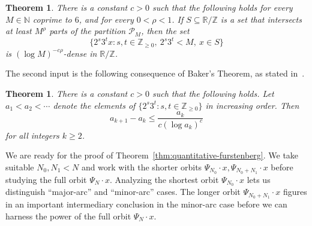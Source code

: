 \documentclass[11pt]{amsart}
\newtheorem{theorem}[lemma]{Theorem}
\theoremstyle{definition}
\begin{document}
\begin{theorem}\label{thm:BLMV-entropy}
There is a constant $c>0$ such that the following holds for every $M \in \mathbb{N}$ coprime to $6$, and for every $0<\rho<1$.  If $S \subseteq \mathbb{R}/\mathbb{Z}$ is a set that intersects at least $M^\rho$ parts of the partition $\mathcal{P}_M$, then the set
$$\{2^s 3^t x: s,t \in \mathbb{Z}_{\geq 0},~ 2^s 3^t< M,~ x \in S\}$$
is $(\log M)^{-c\rho}$-dense in $\mathbb{R}/\mathbb{Z}$.
\end{theorem}
The second input is the following consequence of Baker's Theorem, as stated in~\cite[Corollary 4.4]{BLMV08}.

\begin{theorem}\label{thm:BLMV-baker}
There is a constant $c>0$ such that the following holds.  Let $a_1<a_2<\cdots$ denote the elements of $\{2^s 3^t: s,t \in \mathbb{Z}_{\geq 0}\}$ in increasing order.  Then
$$a_{k+1}-a_k \leq \frac{a_k}{c (\log a_k)^c}$$
for all integers $k \geq 2$.
\end{theorem}
We are ready for the proof of Theorem~\ref{thm:quantitative-furstenberg}.  We take suitable $N_0,N_1<N$ and work with the shorter orbits $\Psi_{N_0} \cdot x, \Psi_{N_0+N_1} \cdot x$ before studying the full orbit $\Psi_N \cdot x$.  Analyzing the shortest orbit $\Psi_{N_0} \cdot x$ lets us distinguish ``major-arc'' and ``minor-arc'' cases.  The longer orbit $\Psi_{N_0+N_1} \cdot x$ figures in an important intermediary conclusion in the minor-arc case before we can harness the power of the full orbit $\Psi_N \cdot x$.
\end{document}
